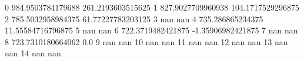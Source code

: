 0 984.9503784179688 261.2193603515625
1 827.9027709960938 104.1717529296875
2 785.5032958984375 61.77227783203125
3 nan nan
4 735.286865234375 11.55584716796875
5 nan nan
6 722.3719482421875 -1.35906982421875
7 nan nan
8 723.7310180664062 0.0
9 nan nan
10 nan nan
11 nan nan
12 nan nan
13 nan nan
14 nan nan
